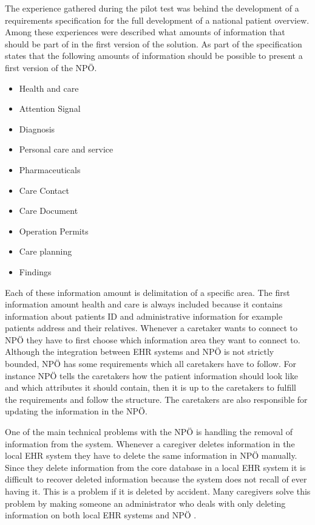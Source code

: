 \documentclass[14pt]{article}
\begin{document}
The experience gathered during the pilot test was behind the development of a requirements specification for the full development of a national patient overview. Among these experiences were described what amounts of information that should be part of in the first version of the solution. As part of the specification states that the following amounts of information should be possible to present a first version of the NPÖ.
\begin{itemize}
\item Health and care
\item Attention Signal
\item Diagnosis
\item Personal care and service
\item Pharmaceuticals
\item Care Contact
\item Care Document
\item Operation Permits
\item Care planning
\item Findings
\end{itemize}
Each of these information amount is delimitation of a specific area. The first information amount health and care is always included because it contains information about patients ID and administrative information for example patients address and their relatives. Whenever a caretaker wants to connect to NPÖ they have to first choose which information area they want to connect to. Although the integration between \gls{EHR} systems and NPÖ is not strictly bounded, NPÖ has some requirements which all caretakers have to follow. For instance NPÖ tells the caretakers how the patient information should look like and which attributes it should contain, then it is up to the caretakers to fulfill the requirements and follow the structure. The caretakers are also responsible for updating the information in the NPÖ. 

One of the main technical problems with the NPÖ is handling the removal of information from the system. Whenever a caregiver deletes information in the local \gls{EHR} system they have to delete the same information in NPÖ manually. Since they delete information from the core database in a local \gls{EHR} system it is difficult to recover deleted information because the system does not recall of ever having it. This is a problem if it is deleted by accident. Many caregivers solve this problem by making someone an administrator who deals with only deleting information on both local \gls{EHR} systems and NPÖ  \cite{ViktorJernelov}.
\end{document}
